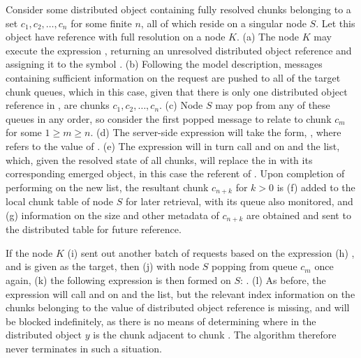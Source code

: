 Consider some distributed object containing fully resolved chunks belonging to a set \({c_1, c_2, \dots, c_n}\) for some finite \(n\), all of which reside on a singular node \(S\).
Let this object have reference  with full resolution on a node \(K\).
(\textcolor{dark2-1}{a}) The node \(K\) may execute the expression , returning an unresolved distributed object reference and assigning it to the symbol .
(\textcolor{dark2-1}{b}) Following the model description, messages containing sufficient information on the request are pushed to all of the target chunk queues, which in this case, given that there is only one distributed object reference in , are chunks \(c_1, c_2, \dots, c_n\).
(\textcolor{dark2-1}{c}) Node \(S\) may pop from any of these queues in any order, so consider the first popped message to relate to chunk \(c_m\) for some \(1 \geq m \geq n\).
(\textcolor{dark2-1}{d}) The server-side expression will take the form, , where  refers to the value of .
(\textcolor{dark2-1}{e}) The expression will in turn call  and  on  and the  list, which, given the resolved state of all chunks, will replace the  in  with its corresponding emerged object, in this case the referent of .
Upon completion of performing  on the new  list, the resultant chunk \(c_{n+k}\) for \(k > 0 \) is (\textcolor{dark2-1}{f}) added to the local chunk table of node \(S\) for later retrieval, with its queue also monitored, and (\textcolor{dark2-1}{g}) information on the size and other metadata of \(c_{n+k}\) are obtained and sent to the distributed table for future reference.

If the node \(K\) (\textcolor{dark2-2}{i}) sent out another batch of requests based on the expression (\textcolor{dark2-2}{h}) , and  is given as the target, then (\textcolor{dark2-2}{j}) with node \(S\) popping from queue \(c_m\) once again, (\textcolor{dark2-2}{k}) the following expression is then formed on \(S\): .
(\textcolor{dark2-2}{l}) As before, the expression will call  and
 on  and the  list,
but the relevant index information on the chunks belonging to the value of
distributed object reference  is missing, and will be blocked
indefinitely, as there is no means of determining where in the distributed
object \(y\) is the chunk adjacent to chunk .
The algorithm therefore never terminates in such a situation.

